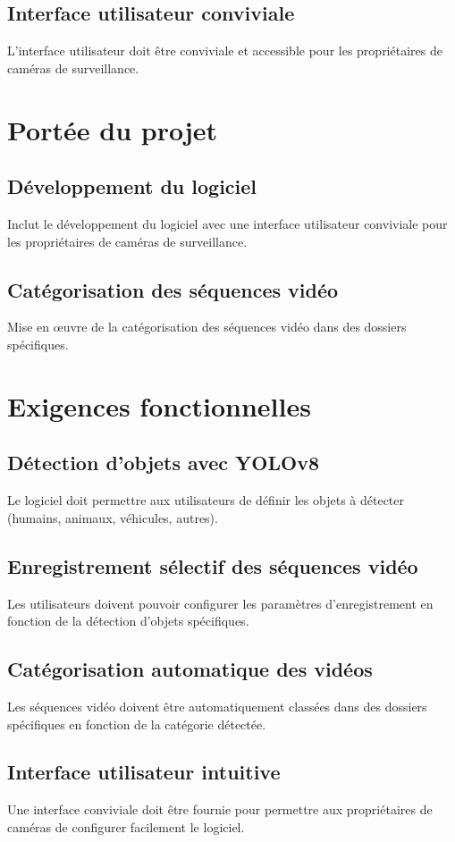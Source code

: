 \documentclass{article}
\begin{document}
\subsection{Interface utilisateur conviviale}
L'interface utilisateur doit être conviviale et accessible pour les propriétaires de caméras de surveillance.

\section{Portée du projet}
\subsection{Développement du logiciel}
Inclut le développement du logiciel avec une interface utilisateur conviviale pour les propriétaires de caméras de surveillance.
\subsection{Catégorisation des séquences vidéo}
Mise en œuvre de la catégorisation des séquences vidéo dans des dossiers spécifiques.

\section{Exigences fonctionnelles}
\subsection{Détection d'objets avec YOLOv8}
Le logiciel doit permettre aux utilisateurs de définir les objets à détecter (humains, animaux, véhicules, autres).
\subsection{Enregistrement sélectif des séquences vidéo}
Les utilisateurs doivent pouvoir configurer les paramètres d'enregistrement en fonction de la détection d'objets spécifiques.
\subsection{Catégorisation automatique des vidéos}
Les séquences vidéo doivent être automatiquement classées dans des dossiers spécifiques en fonction de la catégorie détectée.
\subsection{Interface utilisateur intuitive}
Une interface conviviale doit être fournie pour permettre aux propriétaires de caméras de configurer facilement le logiciel.
\end{document}
